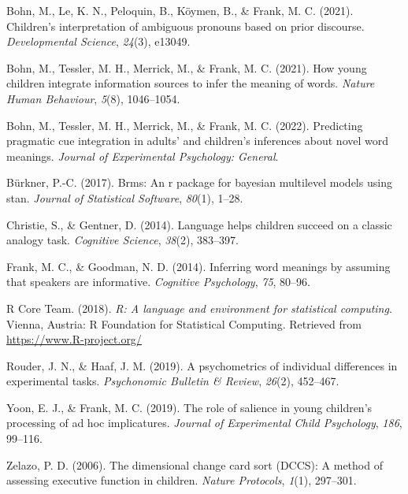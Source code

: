 \documentclass[
  english,
  man,floatsintext]{apa6}
\newlength{\cslhangindent}
\newlength{\cslentryspacingunit} %
\newenvironment{CSLReferences}[2] %
 {%
  \setlength{\parindent}{0pt}
  \ifodd #1
  \let\oldpar\par
  \def\par{\hangindent=\cslhangindent\oldpar}
  \fi
  \setlength{\parskip}{#2\cslentryspacingunit}
 }%
 {}
\begin{document}
\hypertarget{refs}{}
\begin{CSLReferences}{1}{0}
\leavevmode{}%
Bohn, M., Le, K. N., Peloquin, B., Köymen, B., \& Frank, M. C. (2021). Children's interpretation of ambiguous pronouns based on prior discourse. \emph{Developmental Science}, \emph{24}(3), e13049.

\leavevmode{}%
Bohn, M., Tessler, M. H., Merrick, M., \& Frank, M. C. (2021). How young children integrate information sources to infer the meaning of words. \emph{Nature Human Behaviour}, \emph{5}(8), 1046--1054.

\leavevmode{}%
Bohn, M., Tessler, M. H., Merrick, M., \& Frank, M. C. (2022). Predicting pragmatic cue integration in adults' and children's inferences about novel word meanings. \emph{Journal of Experimental Psychology: General}.

\leavevmode{}%
Bürkner, P.-C. (2017). Brms: An r package for bayesian multilevel models using stan. \emph{Journal of Statistical Software}, \emph{80}(1), 1--28.

\leavevmode{}%
Christie, S., \& Gentner, D. (2014). Language helps children succeed on a classic analogy task. \emph{Cognitive Science}, \emph{38}(2), 383--397.

\leavevmode{}%
Frank, M. C., \& Goodman, N. D. (2014). Inferring word meanings by assuming that speakers are informative. \emph{Cognitive Psychology}, \emph{75}, 80--96.

\leavevmode{}%
R Core Team. (2018). \emph{R: A language and environment for statistical computing}. Vienna, Austria: R Foundation for Statistical Computing. Retrieved from \url{https://www.R-project.org/}

\leavevmode{}%
Rouder, J. N., \& Haaf, J. M. (2019). A psychometrics of individual differences in experimental tasks. \emph{Psychonomic Bulletin \& Review}, \emph{26}(2), 452--467.

\leavevmode{}%
Yoon, E. J., \& Frank, M. C. (2019). The role of salience in young children's processing of ad hoc implicatures. \emph{Journal of Experimental Child Psychology}, \emph{186}, 99--116.

\leavevmode{}%
Zelazo, P. D. (2006). The dimensional change card sort (DCCS): A method of assessing executive function in children. \emph{Nature Protocols}, \emph{1}(1), 297--301.

\end{CSLReferences}

\endgroup
\end{document}
